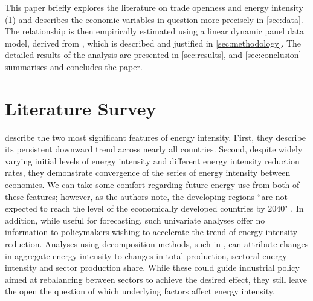\documentclass[12pt,a4paper]{article}
\begin{document}
This paper briefly explores the literature on trade openness and energy intensity (\cref{sec:literature}) and describes the economic variables in question more precisely in \cref{sec:data}.
The relationship is then empirically estimated using a linear dynamic panel data model, derived from \cite{arellanoTestsSpecificationPanel1991}, which is described and justified in \cref{sec:methodology}.
The detailed results of the analysis are presented in \cref{sec:results}, and \cref{sec:conclusion} summarises and concludes the paper.

\section{Literature Survey}\label{sec:literature}

\cite{ederAnalysisEnergyIntensity2018} describe the two most significant features of energy intensity. First, they describe its persistent downward trend across nearly all countries.
Second, despite widely varying initial levels of energy intensity and different energy intensity reduction rates, they demonstrate convergence of the series of energy intensity between economies.
We can take some comfort regarding future energy use from both of these features; however, as the authors note, the developing regions ``are not expected to reach the level of the economically developed countries by 2040" \citep[p. 1971]{ederAnalysisEnergyIntensity2018}.
In addition, while useful for forecasting, such univariate analyses offer no information to policymakers wishing to accelerate the trend of energy intensity reduction. 
Analyses using decomposition methods, such in \cite{liuEightMethodsDecomposing2003}, can attribute changes in aggregate energy intensity to changes in total production, sectoral energy intensity and sector production share. While these could guide industrial policy aimed at rebalancing between sectors to achieve the desired effect, they still leave the open the question of which underlying factors affect energy intensity.
\end{document}
